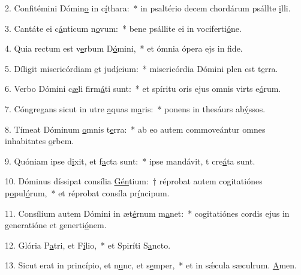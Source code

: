 2. Confitémini Dómin\uline{o} in c\uline{í}thara:~* in psaltério decem chordárum psállte \uline{i}lli.\par 
3. Cantáte ei c\uline{á}nticum n\uline{o}vum:~* bene psállite ei in vociferti\uline{ó}ne.\par 
4. Quia rectum est v\uline{e}rbum D\uline{ó}mini,~* et ómnia ópera ejs in f\uline{i}de.\par 
5. Díligit misericórdiam \uline{e}t jud\uline{í}cium:~* misericórdia Dómini plen est t\uline{e}rra.\par 
6. Verbo Dómini c\uline{æ}li firm\uline{á}ti sunt:~* et spíritu oris ejus omnis virts e\uline{ó}rum.\par 
7. Cóngregans sicut in utre \uline{a}quas m\uline{a}ris:~* ponens in thesáurs ab\uline{ý}ssos.\par 
8. Tímeat Dóminum \uline{o}mnis t\uline{e}rra:~* ab eo autem commoveántur omnes inhabitntes \uline{o}rbem.\par 
9. Quóniam ipse d\uline{i}xit, et f\uline{a}cta sunt:~* ipse mandávit, t cre\uline{á}ta sunt.\par 
10. Dóminus díssipat consília \uline{Gén}tium:~† réprobat autem cogitatiónes p\uline{o}pul\uline{ó}rum,~* et réprobat consíla pr\uline{í}ncipum.\par 
11. Consílium autem Dómini in æt\uline{é}rnum m\uline{a}net:~* cogitatiónes cordis ejus in generatióne et generti\uline{ó}nem.\par 
12. Glória P\uline{a}tri, et F\uline{í}lio,~* et Spiríti S\uline{a}ncto.\par 
13. Sicut erat in princípio, et n\uline{u}nc, et s\uline{e}mper,~* et in sǽcula sæculrum. \uline{A}men.\par 
